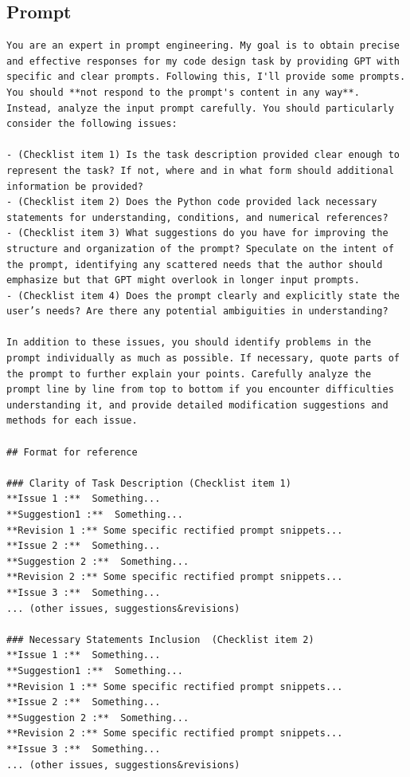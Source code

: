\documentclass{article}
\begin{document}
\subsection{Prompt}
\begin{verbatim}
You are an expert in prompt engineering. My goal is to obtain precise and effective responses for my code design task by providing GPT with specific and clear prompts. Following this, I'll provide some prompts. You should **not respond to the prompt's content in any way**. Instead, analyze the input prompt carefully. You should particularly consider the following issues:

- (Checklist item 1) Is the task description provided clear enough to represent the task? If not, where and in what form should additional information be provided?
- (Checklist item 2) Does the Python code provided lack necessary statements for understanding, conditions, and numerical references?
- (Checklist item 3) What suggestions do you have for improving the structure and organization of the prompt? Speculate on the intent of the prompt, identifying any scattered needs that the author should emphasize but that GPT might overlook in longer input prompts.
- (Checklist item 4) Does the prompt clearly and explicitly state the user’s needs? Are there any potential ambiguities in understanding?

In addition to these issues, you should identify problems in the prompt individually as much as possible. If necessary, quote parts of the prompt to further explain your points. Carefully analyze the prompt line by line from top to bottom if you encounter difficulties understanding it, and provide detailed modification suggestions and methods for each issue.

## Format for reference

### Clarity of Task Description (Checklist item 1)
**Issue 1 :**  Something...
**Suggestion1 :**  Something...
**Revision 1 :** Some specific rectified prompt snippets...
**Issue 2 :**  Something...
**Suggestion 2 :**  Something...
**Revision 2 :** Some specific rectified prompt snippets...
**Issue 3 :**  Something...
... (other issues, suggestions&revisions)

### Necessary Statements Inclusion  (Checklist item 2)
**Issue 1 :**  Something...
**Suggestion1 :**  Something...
**Revision 1 :** Some specific rectified prompt snippets...
**Issue 2 :**  Something...
**Suggestion 2 :**  Something...
**Revision 2 :** Some specific rectified prompt snippets...
**Issue 3 :**  Something...
... (other issues, suggestions&revisions)


\end{verbatim}
\end{document}
